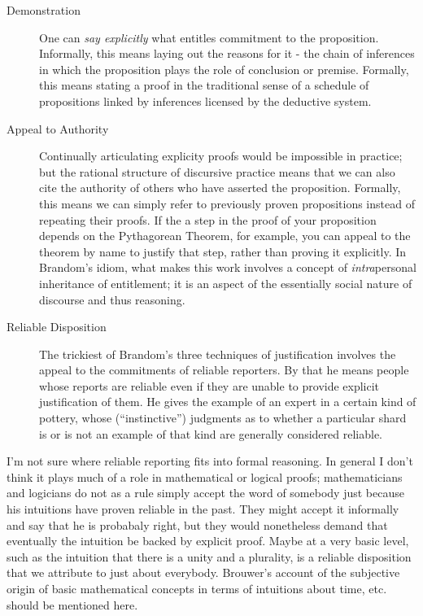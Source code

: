 \begin{description}
\item [Demonstration] One can \emph{say explicitly} what entitles
  commitment to the proposition.  Informally, this means laying out
  the reasons for it - the chain of inferences in which the
  proposition plays the role of conclusion or premise.  Formally,
  this means stating a proof in the traditional sense of a schedule of
  propositions linked by inferences licensed by the deductive system.
\item [Appeal to Authority] Continually articulating explicity proofs
  would be impossible in practice; but the rational structure of
  discursive practice means that we can also cite the authority of
  others who have asserted the proposition.  Formally, this means we
  can simply refer to previously proven propositions instead of
  repeating their proofs.  If the a step in the proof of your
  proposition depends on the Pythagorean Theorem, for example, you can
  appeal to the theorem by name to justify that step, rather than
  proving it explicitly.  In Brandom's idiom, what makes this work
  involves a concept of \emph{intra}personal inheritance of
  entitlement; it is an aspect of the essentially social nature of
  discourse and thus reasoning.
\item [Reliable Disposition] The trickiest of Brandom's three
  techniques of justification involves the appeal to the commitments
  of reliable reporters.  By that he means people whose reports are
  reliable even if they are unable to provide explicit justification
  of them.  He gives the example of an expert in a certain kind of
  pottery, whose (``instinctive'') judgments as to whether a
  particular shard is or is not an example of that kind are generally
  considered reliable.
\end{description}

\begin{ednote}
  I'm not sure where reliable reporting fits into formal reasoning.
  In general I don't think it plays much of a role in mathematical or
  logical proofs; mathematicians and logicians do not as a rule simply
  accept the word of somebody just because his intuitions have proven
  reliable in the past.  They might accept it informally and say that
  he is probabaly right, but they would nonetheless demand that
  eventually the intuition be backed by explicit proof.  Maybe at a
  very basic level, such as the intuition that there is a unity and a
  plurality, is a reliable disposition that we attribute to just about
  everybody.  Brouwer's account of the subjective origin of basic
  mathematical concepts in terms of intuitions about time, etc. should
  be mentioned here.
\end{ednote}

